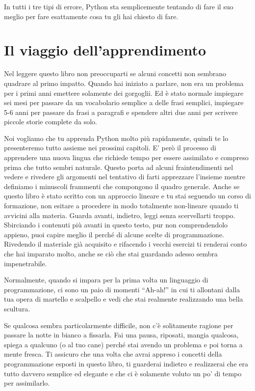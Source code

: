 In tutti i tre tipi di errore, Python sta semplicemente tentando di fare il suo meglio per fare esattamente cosa tu gli hai chiesto di fare.

\section{Il viaggio dell'apprendimento}

Nel leggere questo libro non preoccuparti se alcuni concetti non sembrano quadrare al primo impatto. Quando hai iniziato a parlare, non era un problema per i primi anni emettere solamente dei gorgoglii. Ed \`{e} stato normale impiegare sei mesi per passare da un vocabolario semplice a delle frasi semplici, impiegare 5-6 anni per passare da frasi a paragrafi e spendere altri due anni per scrivere piccole storie complete da solo.

Noi vogliamo che tu apprenda Python molto pi\`{u} rapidamente, quindi te lo presenteremo tutto assieme nei prossimi capitoli. E' per\`{o} il processo di apprendere una nuova lingua che richiede tempo per essere assimilato e compreso prima che tutto sembri naturale. Questo porta ad alcuni fraintendimenti nel vedere e rivedere gli argomenti nel tentativo di farti apprezzare l'insieme mentre definiamo i minuscoli frammenti che compongono il quadro generale. Anche se questo libro \`{e} stato scritto con un approccio lineare e tu stai seguendo un corso di formazione, non esitare a procedere in modo totalmente non-lineare quando ti avvicini alla materia. Guarda avanti, indietro, leggi senza scervellarti troppo. Sbirciando i contenuti pi\`{u} avanti in questo testo, pur non comprendendolo appieno, puoi capire meglio il perch\'{e} di alcune scelte di programmazione. Rivedendo il materiale gi\`{a} acquisito e rifacendo i vecchi esercizi ti renderai conto che hai imparato molto, anche se ci\`{o} che stai guardando adesso sembra impenetrabile.

Normalmente, quando si impara per la prima volta un linguaggio di programmazione, ci sono un paio di momenti {``}Ah-ah!'' in cui ti allontani dalla tua opera di martello e scalpello e vedi che stai realmente realizzando una bella scultura.

Se qualcosa sembra particolarmente difficile, non c'\`{e} solitamente ragione per passare la notte in bianco a fissarla. Fai una pausa, riposati, mangia qualcosa, spiega a qualcuno (o al tuo cane) perch\'{e} stai avendo un problema e poi torna a mente fresca. Ti assicuro che una volta che avrai appreso i concetti della programmazione esposti in questo libro, ti guarderai indietro e realizzerai che era tutto davvero semplice ed elegante e che ci \`{e} solamente voluto un po' di tempo per assimilarlo.

